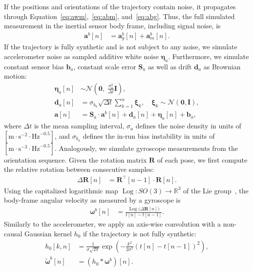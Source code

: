 \documentclass[journal]{IEEEtran}
\renewcommand{\vec}[1]{\boldsymbol{#1}}
\DeclareMathOperator{\Log}{Log}
\begin{document}
If the positions and orientations of the trajectory contain noise, it propagates through Equation~\eqref{eq:awm},~\eqref{eq:abm}, and~\eqref{eq:abg}.
Thus, the full simulated measurement in the inertial sensor body frame, including signal noise, is
\begin{align}
\mathbf{a}^b[n] &= \mathbf{a}^{b}_{g}[n] + \mathbf{a}^{b}_{m}[n].
\end{align}
If the trajectory is fully synthetic and is not subject to any noise, we simulate accelerometer noise as sampled additive white noise $\vec{\eta}_a$.
Furthermore, we simulate constant sensor bias $\vec{b}_a$, constant scale error $\mathbf{S}_a$ as well as drift $\vec{d}_a$ as Brownian motion: 
\begin{align}
\vec{\eta}_a[n] &\sim \mathcal{N}\!\left(\mathbf{0},\;\frac{\sigma_{a}^2}{\Delta t}\mathbf{I}\right),\nonumber \\
\vec{d}_a[n] &= \sigma_{b_a}\sqrt{\Delta t}\sum_{k=1}^{n}\boldsymbol{\xi}_k,\quad
\boldsymbol{\xi}_k\sim\mathcal{N}(\mathbf{0},\mathbf{I}),\nonumber \\
\vec{a}[n] &= \mathbf{S}_a \cdot \vec{a}^b[n]+\vec{d}_a[n]+\vec{\eta}_a[n]+\vec{b}_a,\label{eq:simacc}
\end{align}
where $\Delta t$ is the mean sampling interval, $\sigma_a$ defines the noise density in units of $\left[\text{m} \cdot \text{s}^{-2} \cdot \text{Hz}^{-0.5}\right]$, and $\sigma_{b_a}$ defines the in-run bias instability in units of $\left[\text{m} \cdot \text{s}^{-3} \cdot \text{Hz}^{-0.5}\right]$.
Analogously, we simulate gyroscope measurements from the orientation sequence.
Given the rotation matrix $\mathbf{R}$ of each pose, we first compute the relative rotation between consecutive samples:
\begin{align}
\Delta \mathbf{R}[n] &= \mathbf{R}^\top[n-1] \cdot \mathbf{R}[n].
\end{align}
Using the capitalized logarithmic map $\Log:SO(3)\rightarrow\mathbb{R}^3$ of the Lie group~\cite{microlie}, the body-frame angular velocity as measured by a gyroscope is
\begin{align}
\boldsymbol{\omega}^b[n] &= \frac{\Log\!\big(\Delta \mathbf{R}[n]\big)}{t[n]-t[n-1]}.\label{eq:liegyro}
\end{align}
Similarly to the accelerometer, we apply an axis-wise convolution with a non-causal Gaussian kernel $h_0$ if the trajectory is not fully synthetic:
\begin{align}
h_0[k, n] &= \frac{1}{\sigma \sqrt{2\pi}} \exp\!\left(-\frac{k^2}{2\sigma^2}\left( t[n]-t[n-1] \right)^2\right),\\
\tilde{\boldsymbol{\omega}}^b[n] &= (h_0 * \boldsymbol{\omega}^b)[n].
\end{align}
\end{document}
